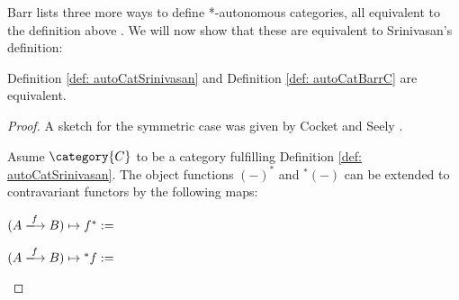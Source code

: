 \documentclass[DIN, pagenumber=false, fontsize=11pt, parskip=half, colorinlistoftodos, svgnames]{scrartcl}
\begin{document}
	Barr lists three more ways to define *-autonomous categories, all equivalent to the definition above \cite{barr95}. We will now show that these are equivalent to Srinivasan's definition:
	
	\begin{theorem}
		\label{equivalenceAutoCats}
		Definition \ref{def: autoCatSrinivasan} and Definition \ref{def: autoCatBarrC} are equivalent.
	\end{theorem}
	
	\begin{proof}
		A sketch for the symmetric case was given by Cocket and Seely \cite[theorem 4.5]{cockett&seely97}. 
		
		Asume $\category{C}$ to be a category fulfilling Definition \ref{def: autoCatSrinivasan}.
		The object functions $(-)^*$ and ${^*(-)}$ can be extended to contravariant functors by the following maps:
		
		\begin{center}
			$(A \xlongrightarrow{f} B) \mapsto f^* := \; $
		\end{center}
		
		\begin{center}
			$(A \xlongrightarrow{f} B) \mapsto {^*f} := \; $
		\end{center}
		

\end{proof}
\end{document}
